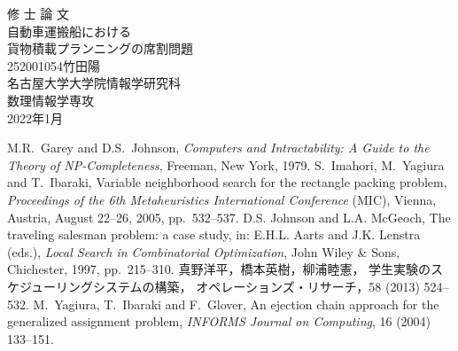 \documentclass[uplatex]{ujreport}
\begin{document}
\begin{table}[b]
\begin{center}
{\huge 修\hspace{0.1cm} 士\hspace{0.1cm} 論\hspace{0.1cm} 文}\\[2.5cm]
{\huge 自動車運搬船における \\ 貨物積載プランニングの席割問題}\\[6cm]
{\huge 252001054\qquad 竹田陽}\\[1cm]
{\huge 名古屋大学大学院情報学研究科}\\[0.5cm]
{\huge 数理情報学専攻}\\[0.5cm]
{\huge 2022年1月}\\
\end{center}
\end{table}


\thispagestyle{empty}
\clearpage
\newpage
{}
\setcounter{page}{1}







\thispagestyle{empty}
\tableofcontents
\newpage
\setcounter{page}{1}
\pagestyle{plain}















\begin{thebibliography}{99}
  M.R.~Garey and D.S.~Johnson,
	 {\it Computers and Intractability: A Guide to the Theory of NP-Completeness},
	 Freeman, New York, 1979.
  S.~Imahori, M.~Yagiura and T.~Ibaraki,
	 Variable neighborhood search for the rectangle packing problem,
         {\it Proceedings of the 6th Metaheuristics International Conference} (MIC),
	 Vienna, Austria, August 22--26, 2005, pp.~532--537.
  D.S. Johnson and L.A. McGeoch,
	 The traveling salesman problem: a case study,
	 in: E.H.L. Aarts and J.K. Lenstra (eds.),
	 {\it Local Search in Combinatorial Optimization},
	 John Wiley \& Sons, Chichester, 1997, pp.~215--310.
  真野洋平，橋本英樹，柳浦睦憲，
	 学生実験のスケジューリングシステムの構築，
	 オペレーションズ・リサーチ，58 (2013) 524--532.
  M.~Yagiura, T.~Ibaraki and F.~Glover,
	 An ejection chain approach for the generalized assignment problem,
	 {\it INFORMS Journal on Computing}, 16 (2004) 133--151.
\end{thebibliography}
\end{document}
